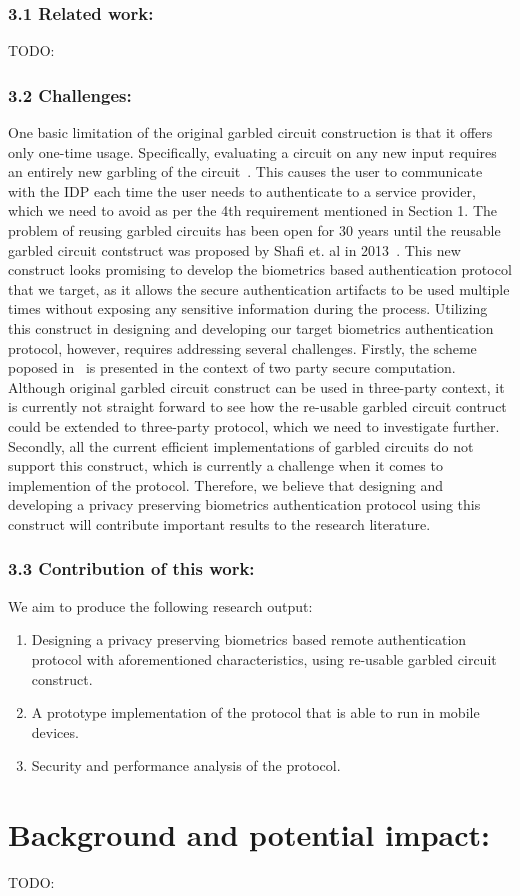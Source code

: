 \documentclass[10pt]{article}
\begin{document}
\subsubsection*{3.1 Related work:}
TODO:

\subsubsection*{3.2 Challenges:}
One basic limitation of the original garbled circuit construction is that it offers only one-time usage. Specifically, evaluating a circuit on any 
new input requires an entirely new garbling of the circuit~\cite{reusablegc}. This causes the user to communicate with the IDP each time the user 
needs to authenticate to a service provider, which we need to avoid as per the 4th requirement mentioned in Section 1. The problem of reusing garbled 
circuits has been open for 30 years until the reusable garbled circuit contstruct was proposed by Shafi et. al in 2013~\cite{reusablegc}. This new 
construct looks promising to develop the biometrics based authentication protocol that we target, as it allows the secure authentication artifacts to 
be used multiple times without exposing any sensitive information during the process.
Utilizing this construct in designing and developing our target biometrics authentication protocol, however, requires addressing several challenges. 
Firstly, the scheme poposed in~\cite{reusablegc} is presented in the context of two party secure computation. Although original garbled circuit 
construct can be used in three-party context, it is currently not straight forward to see how the re-usable garbled circuit contruct could be extended 
to three-party protocol, which we need to investigate further. Secondly, all the current efficient implementations of garbled circuits do not support 
this construct, which is currently a challenge when it comes to implemention of the protocol. Therefore, we believe that designing and developing a 
privacy preserving biometrics authentication protocol using this construct will contribute important results to the research literature.

\subsubsection*{3.3 Contribution of this work:}
We aim to produce the following research output:
\begin{enumerate}
 \item Designing a privacy preserving biometrics based remote authentication protocol with aforementioned characteristics, using re-usable garbled 
circuit construct. 
 \item A prototype implementation of the protocol that is able to run in mobile devices.
 \item Security and performance analysis of the protocol.
\end{enumerate}

\section{Background and potential impact:}
TODO:



 
\end{document}
